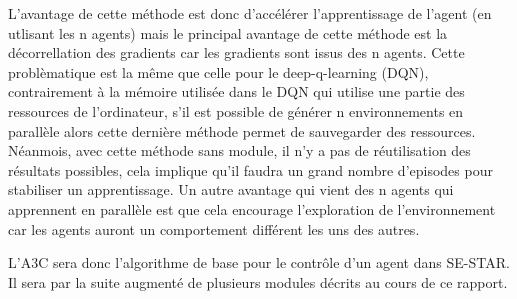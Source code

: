 L'avantage de cette méthode est donc d'accélérer l'apprentissage de l'agent (en utlisant les n agents) mais le principal avantage de cette méthode est la décorrellation des gradients car les gradients sont issus des n agents. Cette problèmatique est la même que celle pour le deep-q-learning (DQN), contrairement à la mémoire utilisée dans le DQN qui utilise une partie des ressources de l'ordinateur, s'il est possible de générer n environnements en parallèle alors cette dernière méthode permet de sauvegarder des ressources. Néanmois, avec cette méthode sans module, il n'y a pas de réutilisation des résultats possibles, cela implique qu'il faudra un grand nombre d'episodes pour stabiliser un apprentissage. Un autre avantage qui vient des n agents qui apprennent en parallèle est que cela encourage l'exploration de l'environnement car les agents auront un comportement différent les uns des autres. 

L'A3C sera donc l'algorithme de base pour le contrôle d'un agent dans SE-STAR. Il sera par la suite augmenté de plusieurs modules décrits au cours de ce rapport.
